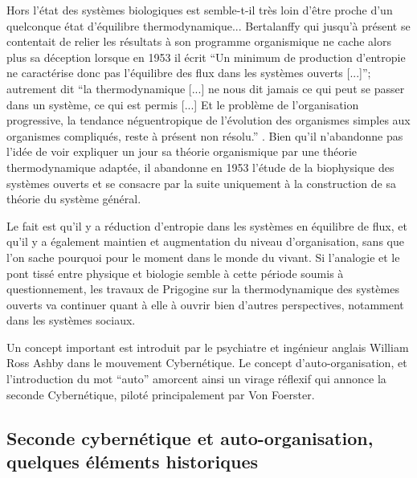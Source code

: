 Hors l'état des systèmes biologiques est semble-t-il très loin d'être proche d'un quelconque état d'équilibre thermodynamique... Bertalanffy qui jusqu'à présent se contentait de relier les résultats à son programme organismique ne cache alors plus sa déception lorsque en 1953 il écrit \enquote{Un minimum de production d'entropie ne caractérise donc pas l'équilibre des flux dans les systèmes ouverts [...]}; autrement dit \enquote{la thermodynamique [...] ne nous dit jamais ce qui peut se passer dans un système, ce qui est permis [...] Et le problème de l'organisation progressive, la tendance néguentropique de l'évolution des organismes simples aux organismes compliqués, reste à présent non résolu.} \autocite[661]{Pouvreau2013}. Bien qu'il n'abandonne pas l'idée de voir expliquer un jour sa théorie organismique par une théorie thermodynamique adaptée, il abandonne en 1953 l'étude de la biophysique des systèmes ouverts et se consacre par la suite uniquement à la construction de sa théorie du système général.

Le fait est qu'il y a réduction d'entropie dans les systèmes en équilibre de flux, et qu'il y a également maintien et augmentation du niveau d'organisation, sans que l'on sache pourquoi pour le moment dans le monde du vivant. Si l'analogie et le pont tissé entre physique et biologie semble à cette période soumis à questionnement, les travaux de Prigogine sur la thermodynamique des systèmes ouverts va continuer quant à elle à ouvrir bien d'autres perspectives, notamment dans les systèmes sociaux.



Un concept important est introduit par le psychiatre et ingénieur anglais William Ross Ashby dans le mouvement Cybernétique. Le concept d'auto-organisation, et l'introduction du mot \enquote{auto} amorcent ainsi un virage réflexif qui annonce la seconde Cybernétique, piloté principalement par Von Foerster.

\subsection{Seconde cybernétique et auto-organisation, quelques éléments historiques}
\label{sssec:heritage_complexe}


